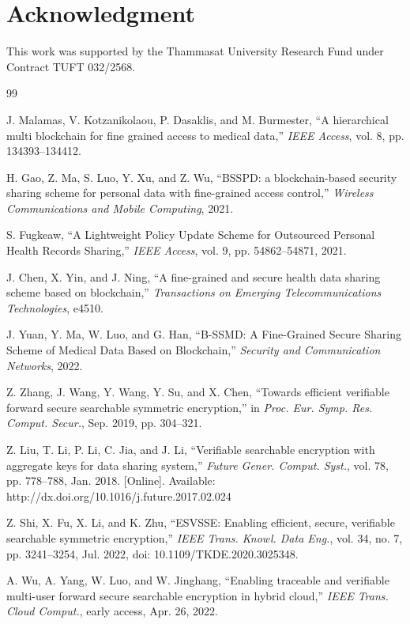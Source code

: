 \documentclass{ieeetj}
\theoremstyle{ieee-style}
\begin{document}
\section{Acknowledgment}
This work was supported by the Thammasat University Research Fund under Contract TUFT 032/2568.



\begin{thebibliography}{99}

J. Malamas, V. Kotzanikolaou, P. Dasaklis, and M. Burmester, “A hierarchical multi blockchain for fine grained access to medical data,” \emph{IEEE Access}, vol. 8, pp. 134393–134412.

H. Gao, Z. Ma, S. Luo, Y. Xu, and Z. Wu, “BSSPD: a blockchain-based security sharing scheme for personal data with fine-grained access control,” \emph{Wireless Communications and Mobile Computing}, 2021.

S. Fugkeaw, “A Lightweight Policy Update Scheme for Outsourced Personal Health Records Sharing,” \emph{IEEE Access}, vol. 9, pp. 54862–54871, 2021.

J. Chen, X. Yin, and J. Ning, “A fine-grained and secure health data sharing scheme based on blockchain,” \emph{Transactions on Emerging Telecommunications Technologies}, e4510.

J. Yuan, Y. Ma, W. Luo, and G. Han, “B-SSMD: A Fine-Grained Secure Sharing Scheme of Medical Data Based on Blockchain,” \emph{Security and Communication Networks}, 2022.

Z. Zhang, J. Wang, Y. Wang, Y. Su, and X. Chen, “Towards efficient verifiable forward secure searchable symmetric encryption,” in \emph{Proc. Eur. Symp. Res. Comput. Secur.}, Sep. 2019, pp. 304–321.

Z. Liu, T. Li, P. Li, C. Jia, and J. Li, “Verifiable searchable encryption with aggregate keys for data sharing system,” \emph{Future Gener. Comput. Syst.}, vol. 78, pp. 778–788, Jan. 2018. [Online]. Available: http://dx.doi.org/10.1016/j.future.2017.02.024

Z. Shi, X. Fu, X. Li, and K. Zhu, “ESVSSE: Enabling efficient, secure, verifiable searchable symmetric encryption,” \emph{IEEE Trans. Knowl. Data Eng.}, vol. 34, no. 7, pp. 3241–3254, Jul. 2022, doi: 10.1109/TKDE.2020.3025348.

A. Wu, A. Yang, W. Luo, and W. Jinghang, “Enabling traceable and verifiable multi-user forward secure searchable encryption in hybrid cloud,” \emph{IEEE Trans. Cloud Comput.}, early access, Apr. 26, 2022.


\end{thebibliography}
\end{document}
